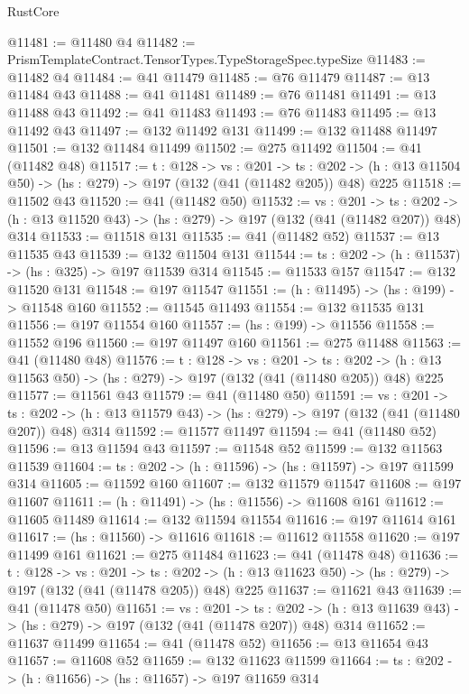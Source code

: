 \begin{lexlean}{RustCore}
\begin{coremodule}
@11481 := @11480 @4
@11482 := PrismTemplateContract.TensorTypes.TypeStorageSpec.typeSize
@11483 := @11482 @4
@11484 := @41 @11479
@11485 := @76 @11479
@11487 := @13 @11484 @43
@11488 := @41 @11481
@11489 := @76 @11481
@11491 := @13 @11488 @43
@11492 := @41 @11483
@11493 := @76 @11483
@11495 := @13 @11492 @43
@11497 := @132 @11492 @131
@11499 := @132 @11488 @11497
@11501 := @132 @11484 @11499
@11502 := @275 @11492
@11504 := @41 (@11482 @48)
@11517 := {t : @128} ->
  {vs : @201} ->
  {ts : @202} -> (h : @13 @11504 @50) -> (hs : @279) -> @197 (@132 (@41 (@11482 @205)) @48) @225
@11518 := @11502 @43
@11520 := @41 (@11482 @50)
@11532 := {vs : @201} ->
  {ts : @202} -> (h : @13 @11520 @43) -> (hs : @279) -> @197 (@132 (@41 (@11482 @207)) @48) @314
@11533 := @11518 @131
@11535 := @41 (@11482 @52)
@11537 := @13 @11535 @43
@11539 := @132 @11504 @131
@11544 := {ts : @202} -> (h : @11537) -> (hs : @325) -> @197 @11539 @314
@11545 := @11533 @157
@11547 := @132 @11520 @131
@11548 := @197 @11547
@11551 := (h : @11495) -> (hs : @199) -> @11548 @160
@11552 := @11545 @11493
@11554 := @132 @11535 @131
@11556 := @197 @11554 @160
@11557 := (hs : @199) -> @11556
@11558 := @11552 @196
@11560 := @197 @11497 @160
@11561 := @275 @11488
@11563 := @41 (@11480 @48)
@11576 := {t : @128} ->
  {vs : @201} ->
  {ts : @202} -> (h : @13 @11563 @50) -> (hs : @279) -> @197 (@132 (@41 (@11480 @205)) @48) @225
@11577 := @11561 @43
@11579 := @41 (@11480 @50)
@11591 := {vs : @201} ->
  {ts : @202} -> (h : @13 @11579 @43) -> (hs : @279) -> @197 (@132 (@41 (@11480 @207)) @48) @314
@11592 := @11577 @11497
@11594 := @41 (@11480 @52)
@11596 := @13 @11594 @43
@11597 := @11548 @52
@11599 := @132 @11563 @11539
@11604 := {ts : @202} -> (h : @11596) -> (hs : @11597) -> @197 @11599 @314
@11605 := @11592 @160
@11607 := @132 @11579 @11547
@11608 := @197 @11607
@11611 := (h : @11491) -> (hs : @11556) -> @11608 @161
@11612 := @11605 @11489
@11614 := @132 @11594 @11554
@11616 := @197 @11614 @161
@11617 := (hs : @11560) -> @11616
@11618 := @11612 @11558
@11620 := @197 @11499 @161
@11621 := @275 @11484
@11623 := @41 (@11478 @48)
@11636 := {t : @128} ->
  {vs : @201} ->
  {ts : @202} -> (h : @13 @11623 @50) -> (hs : @279) -> @197 (@132 (@41 (@11478 @205)) @48) @225
@11637 := @11621 @43
@11639 := @41 (@11478 @50)
@11651 := {vs : @201} ->
  {ts : @202} -> (h : @13 @11639 @43) -> (hs : @279) -> @197 (@132 (@41 (@11478 @207)) @48) @314
@11652 := @11637 @11499
@11654 := @41 (@11478 @52)
@11656 := @13 @11654 @43
@11657 := @11608 @52
@11659 := @132 @11623 @11599
@11664 := {ts : @202} -> (h : @11656) -> (hs : @11657) -> @197 @11659 @314

\end{coremodule}
\end{lexlean}
